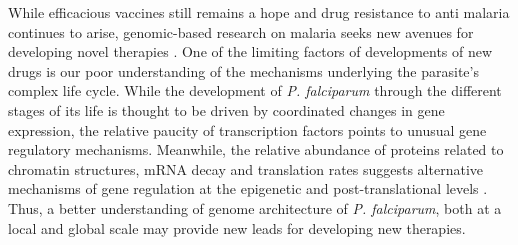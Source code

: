\documentclass[letterpaper,12pt]{article}
\begin{document}
While efficacious vaccines still remains a hope and drug resistance to anti
malaria continues to arise, genomic-based research on malaria seeks new
avenues for developing novel therapies \citep{kirchner:recent}. One of the
limiting factors of developments of new drugs is our poor understanding of the
mechanisms underlying the parasite's complex life cycle. While the development
of {\em P. falciparum} through the different stages of its life is thought to
be driven by coordinated changes in gene expression, the relative paucity of
transcription factors points to unusual gene regulatory mechanisms. Meanwhile,
the relative abundance of proteins related to chromatin structures, mRNA decay
and translation rates suggests alternative mechanisms of gene regulation at
the epigenetic and post-translational levels \citep{cui:chromatin-mediated,
duffy:role, hoeijmakers:placing, horrocks:control, deitsch:mechanisms}. Thus,
a better understanding of genome architecture of {\em P. falciparum}, both at
a local and global scale may provide new leads for developing new therapies.
\end{document}
